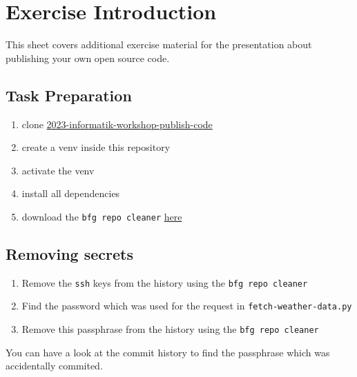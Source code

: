 \documentclass[paper=a4]{scrartcl}
\newcommand{\theexercisenumber}{1} %
\newcommand{\thedate}{September 27, 2023} %
\begin{document}
\date{\thedate}
\exercise{\theexercisenumber}

\parskip 8pt
\makesheetheader

\section*{Exercise Introduction}
This sheet covers additional exercise material for the presentation about publishing your own open source code.

\tableofcontents

\bigskip


	\subsection*{Task Preparation}
		\begin{enumerate}
			\item clone \href{https://github.com/marc-philipp-knechtle/2023-informatik-workshop-publish-code}{2023-informatik-workshop-publish-code}
			\item create a venv inside this repository
			\item activate the venv
			\item install all dependencies
			\item download the \texttt{bfg repo cleaner} \href{https://rtyley.github.io/bfg-repo-cleaner/}{here}
		\end{enumerate}

	\subsection*{Removing secrets}
		\begin{enumerate}
			\item Remove the \texttt{ssh} keys from the history using the \texttt{bfg repo cleaner}
			\item Find the password which was used for the request in \texttt{fetch-weather-data.py}
			\item Remove this passphrase from the history using the \texttt{bfg repo cleaner}
		\end{enumerate}

	\begin{hints}
  		\item 	You can have a look at the commit history to find the passphrase which was accidentally commited.
	\end{hints}
\end{document}
